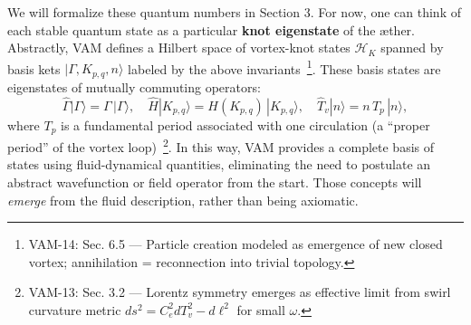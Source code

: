 \documentclass[a4paper,12pt]{article}
\begin{document}
    We will formalize these quantum numbers in Section 3. For now, one can think of each stable quantum state as a particular \textbf{knot eigenstate} of the æther. Abstractly, VAM defines a Hilbert space of vortex-knot states $\mathcal{H}_K$ spanned by basis kets $|\Gamma, K_{p,q}, n\rangle$ labeled by the above invariants~\footnote{VAM-14: Sec. 6.5 — Particle creation modeled as emergence of new closed vortex; annihilation = reconnection into trivial topology.}. These basis states are eigenstates of mutually commuting operators:
    \[
        \hat{\Gamma}|\Gamma\rangle = \Gamma\,|\Gamma\rangle, \quad
        \hat{H} |K_{p,q}\rangle = H(K_{p,q})\,|K_{p,q}\rangle, \quad
        \hat{T}_v|n\rangle = n\,T_p\,|n\rangle,
    \]
    where $T_p$ is a fundamental period associated with one circulation (a “proper period” of the vortex loop)~\footnote{VAM-13: Sec. 3.2 — Lorentz symmetry emerges as effective limit from swirl curvature metric $ds^2 = C_e^2 dT_v^2 - d\ell^2$ for small $\omega$.}. In this way, VAM provides a complete basis of states using fluid-dynamical quantities, eliminating the need to postulate an abstract wavefunction or field operator from the start. Those concepts will \emph{emerge} from the fluid description, rather than being axiomatic.
\end{document}
